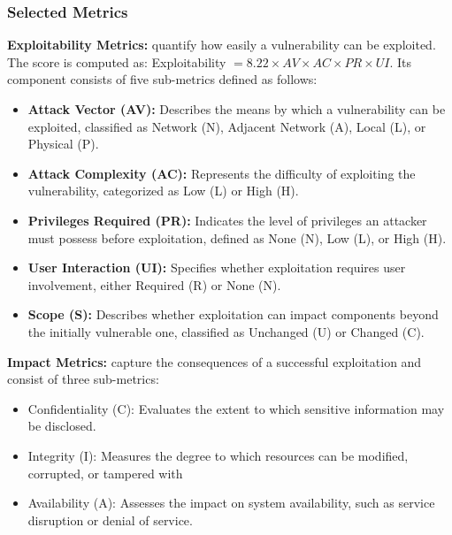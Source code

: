 \documentclass[fleqn,s1,names,tex]{neptune}
\begin{document}
\subsubsection{Selected Metrics}





\cvpt\textbf{Exploitability Metrics:}
quantify how easily a vulnerability can be exploited.
The score is computed as: Exploitability
$\text{}=8.22 \times AV \times AC \times PR \times UI$.
Its component consists of five sub-metrics defined as follows:



\begin{itemize}
    \item
    \textbf{Attack Vector (AV):}  Describes the means by which a vulnerability can be exploited, classified as Network (N), Adjacent Network (A), Local (L), or Physical (P). 
         \item
    \textbf{Attack Complexity (AC):}      Represents the difficulty of exploiting the vulnerability, categorized as Low (L) or High (H).
         \item
    \textbf{Privileges Required (PR):} 
    Indicates the level of privileges an attacker must possess before exploitation, defined as None (N), Low (L), or High (H).
         \item
    \textbf{User Interaction (UI):} Specifies whether exploitation requires user involvement, either Required (R) or None (N).      \item
    \textbf{Scope (S):}  Describes whether exploitation can impact components beyond the initially vulnerable one, classified as Unchanged (U) or Changed (C). 
\end{itemize}


 








\cvpt\textbf{Impact Metrics:}  capture the  consequences of a successful exploitation and consist of three sub-metrics:

\begin{itemize}
    \item
    Confidentiality (C): Evaluates the extent to which sensitive information may be disclosed.
    

     \item 
     Integrity (I): Measures the degree to which       resources can be modified, corrupted, or tampered with 
     

     \item
     Availability (A): Assesses the impact on system availability, such as service disruption or denial of service.
\end{itemize}
\end{document}
